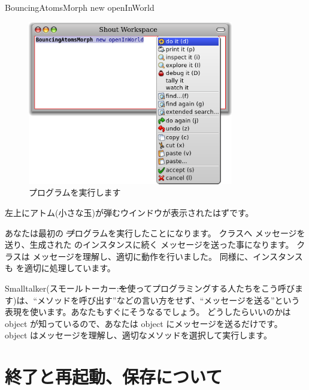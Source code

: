 \documentclass[a4paper,10pt,twoside]{book}
\begin{document}

\begin{code}{}
BouncingAtomsMorph new openInWorld
\end{code}


\begin{figure}[htb]
\centerline {\includegraphics[width=0.8\textwidth]{Doit}}
\caption{プログラムを実行します}
\end{figure}

左上にアトム(小さな玉)が弾むウインドウが表示されたはずです。

あなたは最初の \st プログラムを実行したことになります。
\bam クラスへ  メッセージを送り、生成された \bam のインスタンスに続く  メッセージを送った事になります。
\bam クラスは  メッセージを理解し、適切に動作を行いました。
同様に、\bam インスタンスも  を適切に処理しています。

Smalltalker(スモールトーカー:\st を使ってプログラミングする人たちをこう呼びます)は、``メソッドを呼び出す''などの言い方をせず、``メッセージを送る''という表現を使います。あなたもすぐにそうなるでしょう。
どうしたらいいのかは object が知っているので、あなたは object にメッセージを送るだけです。
object はメッセージを理解し、適切なメソッドを選択して実行します。


\section{終了と再起動、保存について}
\end{document}

